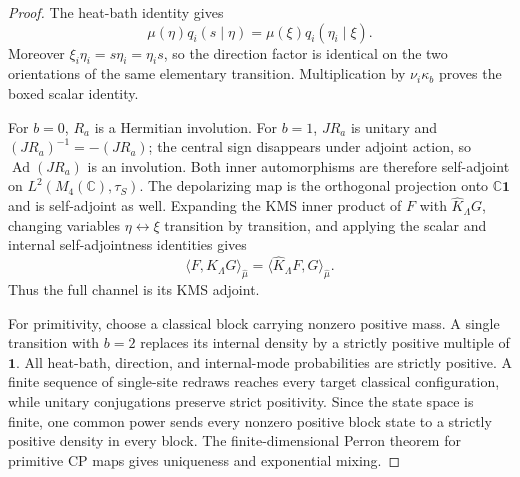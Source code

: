 \documentclass[11pt]{article}
\theoremstyle{definition}
\theoremstyle{remark}
\newcommand{\C}{\mathbb C}
\newcommand{\one}{\mathbf 1}
\newcommand{\Ad}{\operatorname{Ad}}
\begin{document}
\begin{proof}
The heat-bath identity gives
\[
 \mu(\eta)q_i(s\mid\eta)
 =\mu(\xi)q_i(\eta_i\mid\xi).
\]
Moreover $\xi_i\eta_i=s\eta_i=\eta_is$, so the direction factor is identical
on the two orientations of the same elementary transition.  Multiplication by
$\nu_i\kappa_b$ proves the boxed scalar identity.

For $b=0$, $R_a$ is a Hermitian involution.  For $b=1$, $JR_a$ is unitary and
$(JR_a)^{-1}=-(JR_a)$; the central sign disappears under adjoint action, so
$\Ad(JR_a)$ is an involution.  Both inner automorphisms are therefore
self-adjoint on $L^2(M_4(\C),\tau_S)$.  The depolarizing map is the orthogonal
projection onto $\C\one$ and is self-adjoint as well.  Expanding the KMS inner
product of $F$ with $\widehat K_\Lambda G$, changing variables
$\eta\leftrightarrow\xi$ transition by transition, and applying the scalar and
internal self-adjointness identities gives
\[
 \langle F,\widehat K_\Lambda G\rangle_{\widehat\mu}
 =\langle\widehat K_\Lambda F,G\rangle_{\widehat\mu}.
\]
Thus the full channel is its KMS adjoint.

For primitivity, choose a classical block carrying nonzero positive mass.  A
single transition with $b=2$ replaces its internal density by a strictly
positive multiple of $\one$.  All heat-bath, direction, and internal-mode
probabilities are strictly positive.  A finite sequence of single-site redraws
reaches every target classical configuration, while unitary conjugations
preserve strict positivity.  Since the state space is finite, one common power
sends every nonzero positive block state to a strictly positive density in every
block.  The finite-dimensional Perron theorem for primitive CP maps gives
uniqueness and exponential mixing.
\end{proof}
\end{document}
